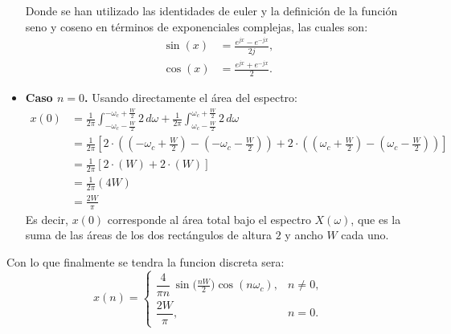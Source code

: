 \documentclass[
  11pt,
  letterpaper,
   addpoints,
   answers
  ]{exam}
\begin{document}
\begin{questions}
\begin{solution}
\begin{itemize}
Donde se han utilizado las identidades de euler y la definición de la función seno y coseno en términos de exponenciales complejas, las cuales son:
\begin{align}
\sin(x)&=\frac{e^{jx}-e^{-jx}}{2j},\\
\cos(x)&=\frac{e^{jx}+e^{-jx}}{2}.
\end{align}
\item \textbf{Caso $n=0$.} Usando directamente el área del espectro:
\[
\begin{aligned}
  x(0) &= \frac{1}{2\pi} \int_{-\omega_c-\frac{W}{2}}^{-\omega_c+\frac{W}{2}} 2\,d\omega
         + \frac{1}{2\pi} \int_{\omega_c-\frac{W}{2}}^{\omega_c+\frac{W}{2}} 2\,d\omega \\
       &= \frac{1}{2\pi} \left[ 2 \cdot \left( \left(-\omega_c+\frac{W}{2}\right) - \left(-\omega_c-\frac{W}{2}\right) \right)
         + 2 \cdot \left( \left(\omega_c+\frac{W}{2}\right) - \left(\omega_c-\frac{W}{2}\right) \right) \right] \\
       &= \frac{1}{2\pi} \left[ 2 \cdot (W) + 2 \cdot (W) \right] \\
       &= \frac{1}{2\pi} (4W) \\
       &= \frac{2W}{\pi}
\end{aligned}
\]
Es decir, $x(0)$ corresponde al área total bajo el espectro $X(\omega)$, que es la suma de las áreas de los dos rectángulos de altura $2$ y ancho $W$ cada uno.
\end{itemize}
Con lo que finalmente se tendra la funcion discreta sera:
\[
x(n)=
\begin{cases}
\dfrac{4}{\pi n}\,\sin\!\big(\frac{nW}{2}\big)\cos(n\omega_c), & n\neq 0,\\[2mm]
\dfrac{2W}{\pi}, & n=0.
\end{cases}
\]
\begin{figure}[H]
\centering
{}
\end{figure}
\end{solution}
\end{questions}
\end{document}
